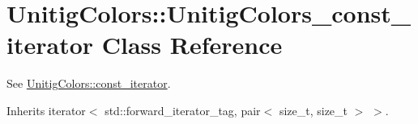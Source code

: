 \hypertarget{classUnitigColors_1_1UnitigColors__const__iterator}{}\section{Unitig\+Colors\+:\+:Unitig\+Colors\+\_\+const\+\_\+iterator Class Reference}
\label{classUnitigColors_1_1UnitigColors__const__iterator}


See \hyperlink{classUnitigColors_ad4d35f8af18dfd9cad99e92ca2328fee}{Unitig\+Colors\+::const\+\_\+iterator}.  




Inherits iterator$<$ std\+::forward\+\_\+iterator\+\_\+tag, pair$<$ size\+\_\+t, size\+\_\+t $>$ $>$.

